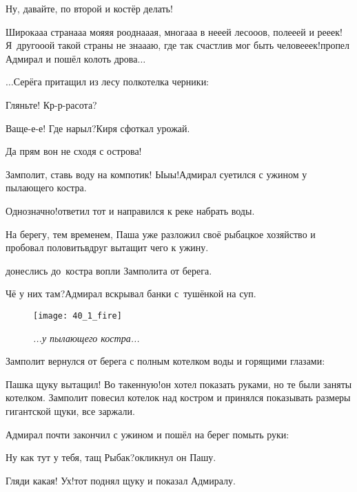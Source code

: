 \diagdash Ну, давайте, по второй и костёр делать!

\diagdash Широка\sdash а\sdash а страна\sdash а\sdash а моя\sdash я\sdash я роодна\sdash а\sdash ая, многа\sdash а\sdash а в не\sdash е\sdash ей лесо\sdash о\sdash ов, поле\sdash е\sdash ей и ре\sdash е\sdash ек! Я~друго\sdash о\sdash ой такой страны не зна\sdash а\sdash аю, где так счастлив мог быть челове\sdash е\sdash ек!\mdash пропел Адмирал и пошёл колоть дрова$\ldots$

\vspace{0.5cm} 
$\ldots$Серёга притащил из лесу полкотелка черники:

\diagdash Гляньте! Кр-р-расота?

\diagdash Ваще-е-е! Где нарыл?\mdash Киря сфоткал урожай.

\diagdash Да прям вон не сходя с острова!

\diagdash Замполит, ставь воду на компотик! Ы\sdash ы\sdash ы!\mdash Адмирал суетился с ужином у пылающего костра.

\diagdash Однозначно!\mdash ответил тот и направился к реке набрать воды.

На берегу, тем временем, Паша уже разложил своё рыбацкое хозяйство и пробовал половить\mdash вдруг вытащит чего к ужину. 

\mdash донеслись до~костра вопли Замполита от берега.

\diagdash Чё у них там?\mdash Адмирал вскрывал банки с~тушёнкой на суп.

\begin{figure}[h]
	\centering
	\texttt{[image: 40\_1\_fire]}
	\caption{\small\textit{...у пылающего костра...}}
\end{figure}

Замполит вернулся от берега с полным котелком воды и горящими глазами:

\diagdash Пашка щуку вытащил! Во такенную!\mdash он хотел показать руками, но те были заняты котелком. Замполит повесил котелок над костром и принялся показывать размеры гигантской щуки, все заржали.

Адмирал почти закончил с ужином и пошёл на берег помыть руки:

\diagdash Ну как тут у тебя, тащ Рыбак?\mdash окликнул он Пашу.

\diagdash Гляди какая! Ух!\mdash тот поднял щуку и показал Адмиралу.

